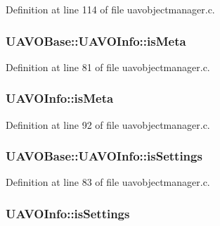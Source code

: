 Definition at line 114 of file uavobjectmanager.\-c.

\hypertarget{group___u_a_v_ga5358cdae3a703bf0ad8b1bb4fc19d1ca}{
\subsubsection[{is\-Meta}]{ U\-A\-V\-O\-Base\-::\-U\-A\-V\-O\-Info\-::is\-Meta}}\label{group___u_a_v_ga5358cdae3a703bf0ad8b1bb4fc19d1ca}


Definition at line 81 of file uavobjectmanager.\-c.

\hypertarget{group___u_a_v_ga6d180f678afa491a14a13dccf7a6916d}{
\subsubsection[{is\-Meta}]{ U\-A\-V\-O\-Info\-::is\-Meta}}\label{group___u_a_v_ga6d180f678afa491a14a13dccf7a6916d}


Definition at line 92 of file uavobjectmanager.\-c.

\hypertarget{group___u_a_v_ga24c38e3db94c7b88d4dd0cfdd2736b4d}{
\subsubsection[{is\-Settings}]{ U\-A\-V\-O\-Base\-::\-U\-A\-V\-O\-Info\-::is\-Settings}}\label{group___u_a_v_ga24c38e3db94c7b88d4dd0cfdd2736b4d}


Definition at line 83 of file uavobjectmanager.\-c.

\hypertarget{group___u_a_v_ga18d192ef3b73129422653ea96a697711}{
\subsubsection[{is\-Settings}]{ U\-A\-V\-O\-Info\-::is\-Settings}}\label{group___u_a_v_ga18d192ef3b73129422653ea96a697711}


